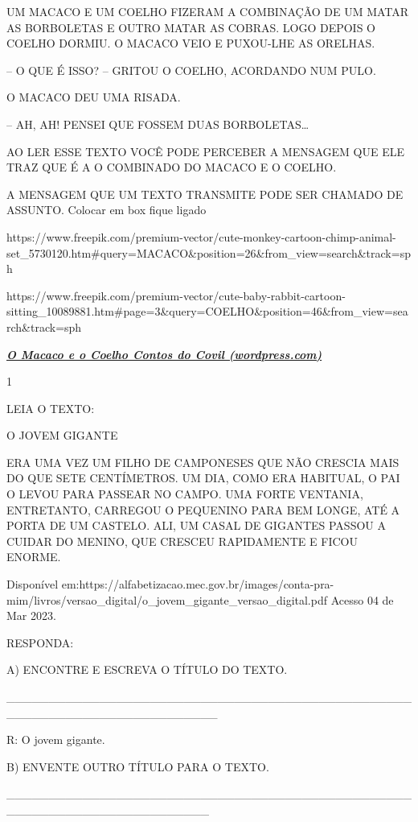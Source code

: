 {{{{{UM MACACO E UM COELHO FIZERAM A COMBINAÇÃO DE UM MATAR AS BORBOLETAS E
OUTRO MATAR AS COBRAS. LOGO DEPOIS O COELHO DORMIU. O MACACO VEIO E
PUXOU-LHE AS ORELHAS.

-- O QUE É ISSO? -- GRITOU O COELHO, ACORDANDO NUM PULO.

O MACACO DEU UMA RISADA.

-- AH, AH! PENSEI QUE FOSSEM DUAS BORBOLETAS\ldots{}

AO LER ESSE TEXTO VOCÊ PODE PERCEBER A MENSAGEM QUE ELE TRAZ QUE É A O
COMBINADO DO MACACO E O COELHO.

A MENSAGEM QUE UM TEXTO TRANSMITE PODE SER CHAMADO DE ASSUNTO. Colocar
em box fique ligado

https://www.freepik.com/premium-vector/cute-monkey-cartoon-chimp-animal-set\_5730120.htm\#query=MACACO\&position=26\&from\_view=search\&track=sph

https://www.freepik.com/premium-vector/cute-baby-rabbit-cartoon-sitting\_10089881.htm\#page=3\&query=COELHO\&position=46\&from\_view=search\&track=sph

\href{https://contosdocovil.wordpress.com/2008/05/17/o-macaco-e-o-coelho/}{\textbf{\emph{O
Macaco e o Coelho \textbar{} Contos do Covil (wordpress.com)}}}


\num{1}

LEIA O TEXTO:

O JOVEM GIGANTE

ERA UMA VEZ UM FILHO DE CAMPONESES QUE NÃO CRESCIA MAIS DO QUE SETE
CENTÍMETROS. UM DIA, COMO ERA HABITUAL, O PAI O LEVOU PARA PASSEAR NO
CAMPO. UMA FORTE VENTANIA, ENTRETANTO, CARREGOU O PEQUENINO PARA BEM
LONGE, ATÉ A PORTA DE UM CASTELO. ALI, UM CASAL DE GIGANTES PASSOU A
CUIDAR DO MENINO, QUE CRESCEU RAPIDAMENTE E FICOU ENORME.

Disponível
em:https://alfabetizacao.mec.gov.br/images/conta-pra-mim/livros/versao\_digital/o\_jovem\_gigante\_versao\_digital.pdf
Acesso 04 de Mar 2023.

RESPONDA:

A) ENCONTRE E ESCREVA O TÍTULO DO TEXTO.

\_\_\_\_\_\_\_\_\_\_\_\_\_\_\_\_\_\_\_\_\_\_\_\_\_\_\_\_\_\_\_\_\_\_\_\_\_\_\_\_\_\_\_\_\_\_\_\_\_\_\_\_\_\_\_\_\_\_\_\_\_\_\_\_\_\_\_\_\_\_\_\_\_

R: O jovem gigante.

B) ENVENTE OUTRO TÍTULO PARA O TEXTO.

\_\_\_\_\_\_\_\_\_\_\_\_\_\_\_\_\_\_\_\_\_\_\_\_\_\_\_\_\_\_\_\_\_\_\_\_\_\_\_\_\_\_\_\_\_\_\_\_\_\_\_\_\_\_\_\_\_\_\_\_\_\_\_\_\_\_\_\_\_\_\_\_

}}}}}
